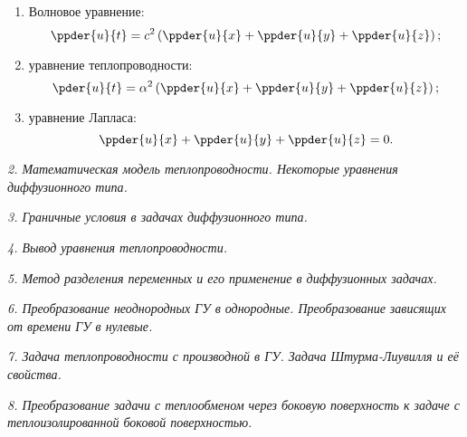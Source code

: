 
\begin{enumerate}
    \item Волновое уравнение:
    \[
        \ppder{u}{t} = c^2\left(\ppder{u}{x} + \ppder{u}{y} +
        \ppder{u}{z}\right);
    \]

    \item уравнение теплопроводности:
    \[
        \pder{u}{t} = \alpha^2\left(\ppder{u}{x} + \ppder{u}{y} +
        \ppder{u}{z}\right);
    \]

    \item уравнение Лапласа:
    \[
        \ppder{u}{x} + \ppder{u}{y} + \ppder{u}{z} = 0.
    \]
\end{enumerate}

\newpage %

\emph{2. Математическая модель теплопроводности. Некоторые уравнения
диффузионного типа.}

\newpage %

\emph{3. Граничные условия в задачах диффузионного типа.}

\newpage %

\emph{4. Вывод уравнения теплопроводности.}

\newpage %

\emph{5. Метод разделения переменных и его применение в диффузионных задачах.}

\newpage %

\emph{6. Преобразование неоднородных ГУ в однородные. Преобразование зависящих
от времени ГУ в нулевые.}

\newpage %

\emph{7. Задача теплопроводности с производной в ГУ. Задача Штурма-Лиувилля и её
свойства.}

\newpage %

\emph{8. Преобразование задачи с теплообменом через боковую поверхность к задаче
с теплоизолированной боковой поверхностью.}

\newpage %


